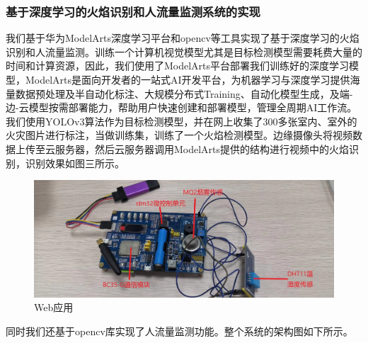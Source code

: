\documentclass{ctexart}
\begin{document}
	\subsubsection{基于深度学习的火焰识别和人流量监测系统的实现}
	我们基于华为ModelArts深度学习平台和opencv等工具实现了基于深度学习的火焰识别和人流量监测。训练一个计算机视觉模型尤其是目标检测模型需要耗费大量的时间和计算资源，因此，我们使用了ModelArts平台部署我们训练好的深度学习模型，ModelArts是面向开发者的一站式AI开发平台，为机器学习与深度学习提供海量数据预处理及半自动化标注、大规模分布式Training、自动化模型生成，及端-边-云模型按需部署能力，帮助用户快速创建和部署模型，管理全周期AI工作流。我们使用YOLOv3算法作为目标检测模型，并在网上收集了300多张室内、室外的火灾图片进行标注，当做训练集，训练了一个火焰检测模型。边缘摄像头将视频数据上传至云服务器，然后云服务器调用ModelArts提供的结构进行视频中的火焰识别，识别效果如图三所示。\par
	\begin{figure}
		\centering
		\includegraphics[scale=0.2]{1.jpg}
		\caption{Web应用}
		\label{图2}
	\end{figure}
	同时我们还基于opencv库实现了人流量监测功能。整个系统的架构图如下所示。
	
	
\end{document}
